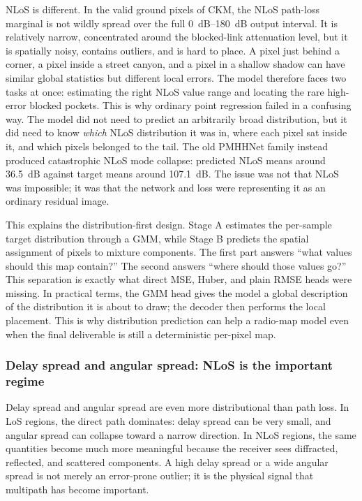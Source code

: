 NLoS is different. In the valid ground pixels of CKM, the NLoS path-loss
marginal is not wildly spread over the full \SIrange{0}{180}{dB} output
interval. It is relatively narrow, concentrated around the blocked-link
attenuation level, but it is spatially noisy, contains outliers, and is hard
to place. A pixel just behind a corner, a pixel inside a street canyon, and a
pixel in a shallow shadow can have similar global statistics but different
local errors. The model therefore faces two tasks at once: estimating the
right NLoS value range and locating the rare high-error blocked pockets. This
is why ordinary point regression failed in a confusing way. The model did not
need to predict an arbitrarily broad distribution, but it did need to know
\emph{which} NLoS distribution it was in, where each pixel sat inside it, and
which pixels belonged to the tail. The old PMHHNet family instead produced
catastrophic NLoS mode collapse: predicted NLoS means around \SI{36.5}{dB}
against target means around \SI{107.1}{dB}. The issue was not that NLoS was
impossible; it was that the network and loss were representing it as an
ordinary residual image.

This explains the distribution-first design. Stage A estimates the per-sample
target distribution through a GMM, while Stage B predicts the spatial
assignment of pixels to mixture components. The first part answers
``what values should this map contain?'' The second answers ``where should
those values go?'' This separation is exactly what direct MSE, Huber, and
plain RMSE heads were missing.  In practical terms, the GMM head gives the
model a global description of the distribution it is about to draw; the decoder
then performs the local placement.  This is why distribution prediction can
help a radio-map model even when the final deliverable is still a deterministic
per-pixel map.

\subsubsection{Delay spread and angular spread: NLoS is the important regime}

Delay spread and angular spread are even more distributional than path loss.
In LoS regions, the direct path dominates: delay spread can be very small, and
angular spread can collapse toward a narrow direction. In NLoS regions, the
same quantities become much more meaningful because the receiver sees
diffracted, reflected, and scattered components. A high delay spread or a wide
angular spread is not merely an error-prone outlier; it is the physical signal
that multipath has become important.

